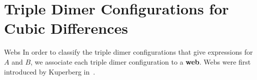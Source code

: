 \documentclass[11pt]{article}
\theoremstyle{definition}
\numberwithin{equation}{section}
\numberwithin{equation}{section}
\begin{document}
\section{Triple Dimer Configurations for Cubic Differences}\label{section:tripledimers}

\begin{subsection}{Webs}\label{subsection:webs}
In order to classify the triple dimer configurations that give expressions for $A$ and $B$, we associate each triple dimer configuration to a \textbf{web}. Webs were first introduced by Kuperberg in~\cite{kup96}. 

\begin{figure}
\centering

\begin{tikzpicture}[x=0.75pt,y=0.75pt,yscale=-1,xscale=1]


\end{tikzpicture}
\end{figure}
\end{subsection}
\end{document}
